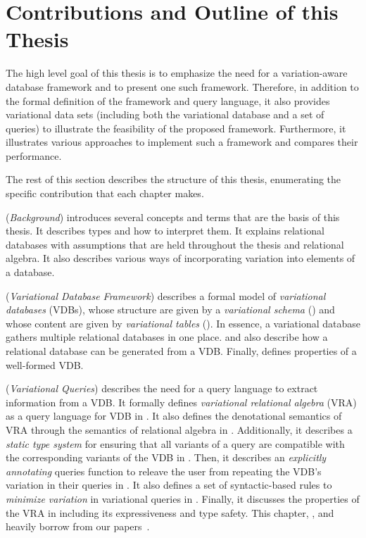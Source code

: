 \section{Contributions and Outline of this Thesis}
\label{sec:contribution}

The high level goal of this thesis is to emphasize the need for a variation-aware database
framework and to present one such framework. Therefore, in addition to the formal 
definition of the framework and query language, it also provides variational data sets 
(including both the variational database and a set of queries) to illustrate the feasibility
of the proposed framework. Furthermore, it illustrates various approaches to implement
such a framework and compares their performance.

The rest of this section describes the structure of this thesis, enumerating the specific 
contribution that each chapter makes. 

 (\emph{Background}) introduces several concepts and terms that are the 
basis of this thesis. It describes types and how to interpret them. It explains relational
databases with assumptions that are held throughout the thesis and relational algebra. 
It also describes various ways of incorporating variation
into elements of a database. 

 (\emph{Variational Database Framework}) describes a formal model of
\emph{variational databases} (VDBs), whose
structure are given by a \emph{variational schema} () and whose content are given
by \emph{variational tables} ().
In essence, a variational database gathers multiple relational databases in one place.
 and  also describe how a relational database can be generated
from a VDB.
Finally,  defines properties of a well-formed VDB.

 (\emph{Variational Queries}) describes the need for a query language 
to extract information from a VDB. It formally defines 
\emph{variational relational algebra} (VRA) as a query language for
VDB in .
%
It also defines the denotational semantics of VRA through the semantics of
relational algebra in .
%
Additionally, it describes a \emph{static type system} for ensuring that all variants of a query are
compatible with the corresponding variants of the VDB in .
% 
Then, it describes an \emph{explicitly annotating} queries function to releave the 
user from repeating the VDB's variation in their queries in .
%
It also defines a set of syntactic-based rules to \emph{minimize variation} in 
variational queries in .
%
Finally, it discusses the properties of the VRA in  including its expressiveness and 
type safety. 
%
This chapter, , and  heavily borrow from our papers~\cite{ATW17dbpl, ATW18poly, vldbArXiv}.

